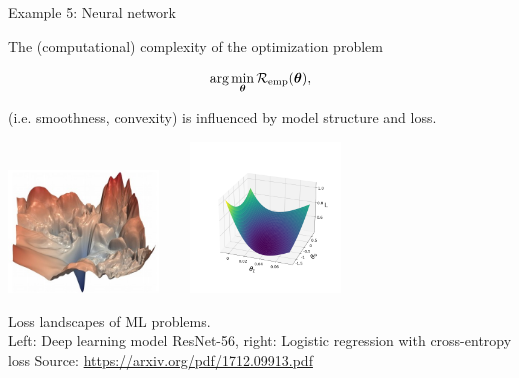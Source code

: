 \begin{vbframe}{Example 5: Neural network}

The (computational) complexity of the optimization problem 

$$
\text{arg} \min_{\bm{\theta}} \mathcal{R}_{\text{emp}}(\bm{\theta}),
$$

(i.e. smoothness, convexity) is influenced by model structure and loss. 		
\vspace*{-0.3cm}
\begin{center}
		\includegraphics[width=0.3\textwidth]{figure_man/ml_landscape.jpg} ~~~ \includegraphics[width=0.3\textwidth]{figure_man/log_reg.png}
	\begin{footnotesize}
		\newline
		Loss landscapes of ML problems. \\ Left: Deep learning model ResNet-56, right: Logistic regression with cross-entropy loss
		\newline
		Source: \url{https://arxiv.org/pdf/1712.09913.pdf}
	\end{footnotesize}
\end{center}	

\end{vbframe}


\endlecture


